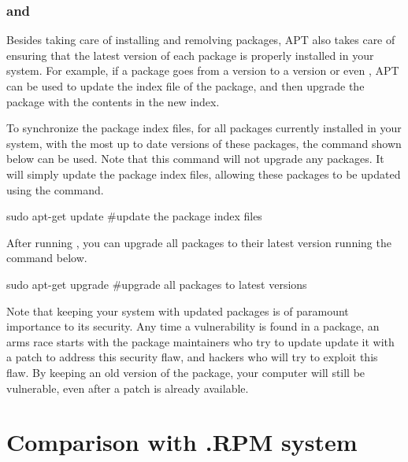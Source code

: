 \subsubsection*{ and }

Besides taking care of installing and remolving packages, \acs{APT} also takes care of ensuring that the latest version of each package is properly installed in your system. For example, if a package goes from a version  to a version  or even , \acs{APT} can be used to update the index file of the package, and then upgrade the package with the contents in the new index. 

To synchronize the package index files, for all packages currently installed in your system, with the most up to date versions of these packages, the  command shown below can be used. Note that this command will not upgrade any packages. It will simply update the package index files, allowing these packages to be updated using the  command.

\begin{command_line}[make]
sudo apt-get update #update the package index files
\end{command_line}

After running , you can upgrade all packages to their latest version running the command below.

\begin{command_line}[make]
sudo apt-get upgrade #upgrade all packages to latest versions
\end{command_line}

Note that keeping your system with updated packages is of paramount importance to its security. Any time a vulnerability is found in a package, an arms race starts with the package maintainers who try to update update it with a patch to address this security flaw, and hackers who will try to exploit this flaw. By keeping an old version of the package, your computer will still be vulnerable, even after a patch is already available.


\section{Comparison with .RPM system}

